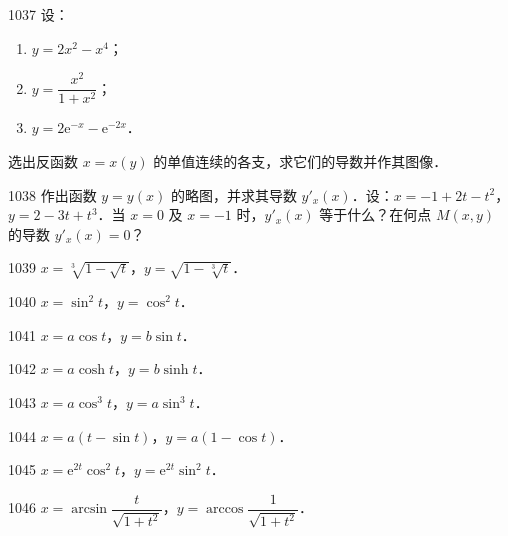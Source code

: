 \begin{prob}[L]{1037}
设：
\begin{enumerate}[label=(\alph*), itemsep=2pt, topsep=3pt]
  \item $y = 2x^2 - x^4$；
  \item $y = \dfrac{x^2}{1 + x^2}$；
  \item $y = 2\mathrm{e}^{-x} - \mathrm{e}^{-2x}$．
\end{enumerate}
选出反函数 $x = x(y)$ 的单值连续的各支，求它们的导数并作其图像．
\end{prob}

\begin{prob}[L]{1038}
作出函数 $y = y(x)$ 的略图，并求其导数 $y'_x(x)$．设：$x = -1 + 2t - t^2$，$y = 2 - 3t + t^3$．当 $x = 0$ 及 $x = -1$ 时，$y'_x(x)$ 等于什么？在何点 $M(x, y)$ 的导数 $y'_x(x) = 0$？
\end{prob}


\begin{prob}[S]{1039}
$x = \sqrt[3]{1 - \sqrt{t}}$，$y = \sqrt{1 - \sqrt[3]{t}}$．
\end{prob}

\begin{prob}[S]{1040}
$x = \sin^2 t$，$y = \cos^2 t$．
\end{prob}

\begin{prob}[S]{1041}
$x = a\cos t$，$y = b\sin t$．
\end{prob}

\begin{prob}[S]{1042}
$x = a\cosh t$，$y = b\sinh t$．
\end{prob}

\begin{prob}[S]{1043}
$x = a\cos^3 t$，$y = a\sin^3 t$．
\end{prob}

\begin{prob}[S]{1044}
$x = a(t - \sin t)$，$y = a(1 - \cos t)$．
\end{prob}

\begin{prob}[S]{1045}
$x = \mathrm{e}^{2t} \cos^2 t$，$y = \mathrm{e}^{2t} \sin^2 t$．
\end{prob}

\begin{prob}[S]{1046}
$x = \arcsin \dfrac{t}{\sqrt{1 + t^2}}$，$y = \arccos \dfrac{1}{\sqrt{1 + t^2}}$．
\end{prob}

